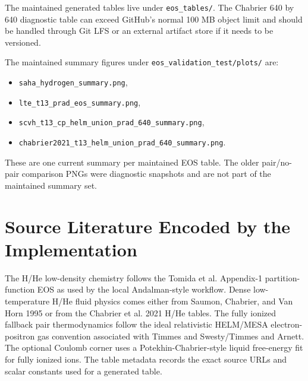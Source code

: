 \documentclass[11pt]{article}
\begin{document}
The maintained generated tables live under \texttt{eos\_tables/}.  The
Chabrier 640 by 640 diagnostic table can exceed GitHub's normal 100 MB object
limit and should be handled through Git LFS or an external artifact store if it
needs to be versioned.

The maintained summary figures under
\texttt{eos\_validation\_test/plots/} are:
\begin{itemize}
  \item \texttt{saha\_hydrogen\_summary.png},
  \item \texttt{lte\_t13\_prad\_eos\_summary.png},
  \item \texttt{scvh\_t13\_cp\_helm\_union\_prad\_640\_summary.png},
  \item \texttt{chabrier2021\_t13\_helm\_union\_prad\_640\_summary.png}.
\end{itemize}
These are one current summary per maintained EOS table.  The older pair/no-pair
comparison PNGs were diagnostic snapshots and are not part of the maintained
summary set.

\section{Source Literature Encoded by the Implementation}

The H/He low-density chemistry follows the Tomida et al. Appendix-1
partition-function EOS as used by the local Andalman-style workflow.  Dense
low-temperature H/He fluid physics comes either from Saumon, Chabrier, and Van
Horn 1995 or from the Chabrier et al. 2021 H/He tables.  The fully ionized
fallback pair thermodynamics follow the ideal relativistic HELM/MESA
electron-positron gas convention associated with Timmes and Swesty/Timmes and
Arnett.  The optional Coulomb corner uses a Potekhin-Chabrier-style liquid
free-energy fit for fully ionized ions.  The table metadata records the exact
source URLs and scalar constants used for a generated table.
\end{document}
